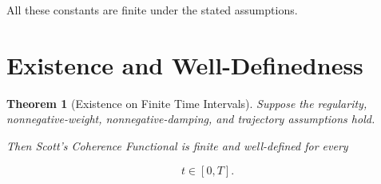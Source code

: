 \documentclass[12pt]{article}
\numberwithin{equation}{section}
\newtheorem{theorem}{Theorem}[section]
\theoremstyle{definition}
\theoremstyle{remark}
\begin{document}
All these constants are finite under
the stated assumptions.


\section{Existence and Well-Definedness}

\begin{theorem}[Existence on Finite Time Intervals]

Suppose the regularity, nonnegative-weight,
nonnegative-damping, and trajectory
assumptions hold.

Then Scott's Coherence Functional is finite
and well-defined for every

\[
t\in[0,T].
\]

\end{theorem}
\end{document}
